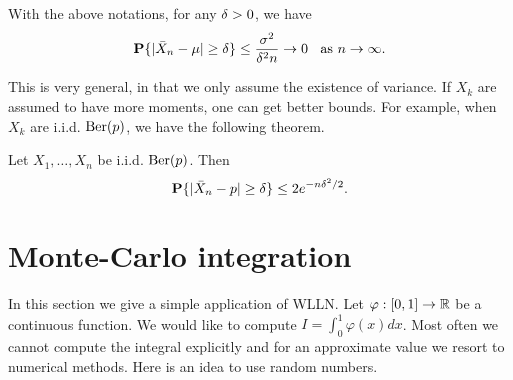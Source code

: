 \documentclass[preprint,  11pt]{amsart}
\def\sig{{\sigma}}
\renewcommand\phi{{\varphi}}
\begin{document}
  With the above notations, for any $\delta>0$, we have
$$
\P\{|\bar{X}_{n}-\mu|\ge \del\}\le \frac{\sig^{2}}{\del^{2}n}\to 0 \;\; \mb{ as }n\to \infty.
$$

\medskip
This is very general, in that we only assume the existence of variance. If $X_{k}$ are assumed to have more moments, one can get better bounds. For example,  when $X_{k}$ are i.i.d. $\mbox{Ber}(p)$, we have the following theorem.

 Let $X_{1},\ldots ,X_{n}$ be i.i.d. $\mbox{Ber}(p)$. Then
$$
\mathbf{P}\{|\bar{X}_{n}-p|\ge \delta\} \le 2e^{-n\delta^{2}/2}.
$$






\section{Monte-Carlo integration} In this section we give  a simple application of WLLN. Let $\phi:[0,1]\to \R$ be a continuous function. We would like to compute $I=\int_{0}^{1}\phi(x)dx$. Most often we cannot compute the integral explicitly and for an approximate value we resort to numerical methods. Here is an idea to use random numbers.
\end{document}
